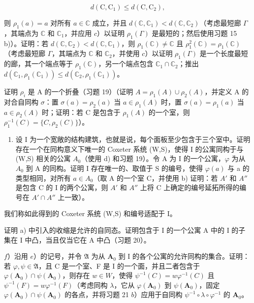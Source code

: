 \[
d (\mathrm{C}, \mathrm{C} _ {1}) \leqslant d (\mathrm{C}, \mathrm{C} _ {2}),
\]

则 \(\rho_{1}(a) = a\) 对所有 \(a \in \mathbb{C}\) 成立，并且 \(d(\mathbb{C}, \mathbb{C}_{1}) < d(\mathbb{C}, \mathbb{C}_{2})\)（考虑最短廊 \(\Gamma\)，其端点为 \(\mathbb{C}\) 和 \(\mathbb{C}_{1}\)，并应用 \(c\)）以证明 \(\rho_{1}(\Gamma)\) 是最短的；然后使用习题 15 b)）。证明：若 \(d(\mathbb{C}, \mathbb{C}_{2}) < d(\mathbb{C}, \mathbb{C}_{1})\)，则 \(\rho_{1}(\mathbb{C}) \neq \mathbb{C}\) 且 \(\rho_{1}^{2}(\mathbb{C}) = \rho_{1}(\mathbb{C})\)（考虑最短廊 \(\Gamma\)，其端点为 \(\mathbb{C}\) 和 \(\mathbb{C}_{2}\)，并使用 \(c\)）以证明 \(\rho_{1}(\Gamma)\) 是一个长度最短的廊，其一个端点等于 \(\rho_{1}(\mathbb{C})\)，另一个端点包含 \(\mathbb{C}_{1} \cap \mathbb{C}_{2}\)；推出 \(d(\mathbb{C}_{1}, \rho_{1}(\mathbb{C}_{1})) \leqslant d(\mathbb{C}_{2}, \rho_{1}(\mathbb{C}_{1}))\)。

证明 \(\rho_{i}\) 是 A 的一个折叠（习题 19）（证明 \(A = \rho_{1}(A) \cup \rho_{2}(A)\)，并定义 A 的对合自同构 \(\sigma\)：置 \(\sigma(a) = \rho_{2}(a)\) 当 \(a \in \rho_{1}(A)\) 时，置 \(\sigma(a) = \rho_{1}(a)\) 当 \(a \in \rho_{2}(A)\) 时；证明：若 C 是包含于 \(\rho_{1}(A)\) 的一个室，则 \(\rho_{1}^{-1}(C) = \{C, \rho_{2}(C)\}\)）。

\begin{enumerate}
\def\labelenumi{\alph{enumi})}
\setcounter{enumi}{4}
\tightlist
\item
  设 I 为一个宽敞的结构建筑，也就是说，每个面板至少包含于三个室中。证明存在一个在同构意义下唯一的 Coxeter 系统 (W,S)，使得 I 的公寓同构于与 (W,S) 相关的公寓 \(A_{0}\)（使用 d) 和习题 19）。令 A 为 I 的一个公寓，\(\varphi\) 为从 \(A_{0}\) 到 A 的同构。证明 I 存在唯一的、取值于 S 的编号，使得 \(\varphi(a)\) 与 a 的类型相同，对所有 \(a \in A_{0}\)（取 A 的一个室 C，并使用 b) 证明：若 \(A'\) 和 \(A''\) 是包含 C 的 I 的两个公寓，则 \(A'\) 和 \(A''\) 上将 C 上确定的编号延拓所得的编号在 \(A' \cap A''\) 上一致）。
\end{enumerate}

我们称如此得到的 Coxeter 系统 (W,S) 和编号适配于 I。

证明 a) 中引入的收缩是允许的自同态。证明包含于 I 的一个公寓 A 中的 I 的子集在 I 中凸，当且仅当它在 A 中凸（习题 20）。

\(f\)）沿用 \(e\)）的记号，并令 \(\mathfrak{A}\) 为从 \(\mathbf{A}_0\) 到 I 的各个公寓的允许同构的集合。证明：若 \(\varphi, \psi \in \mathfrak{A}\)，且 C 是一个室、F 是 I 的一个面，并且二者包含于 \(\varphi(\mathbf{A}_0) \cap \psi(\mathbf{A}_0)\)，则存在 \(w \in W\)，使得 \(\psi^{-1}(C) = w\varphi^{-1}(C)\) 且 \(\psi^{-1}(F) = w\varphi^{-1}(F)\)（考虑同构 \(\lambda\)，它从 \(\varphi(\mathbf{A}_0)\) 到 \(\psi(\mathbf{A}_0)\)，固定 \(\varphi(\mathbf{A}_0) \cap \psi(\mathbf{A}_0)\) 的各点，并将习题 21 \(b\)）应用于自同构 \(\psi^{-1} \circ \lambda \circ \varphi^{-1}\) 的 \(\mathbf{A}_0\)。

